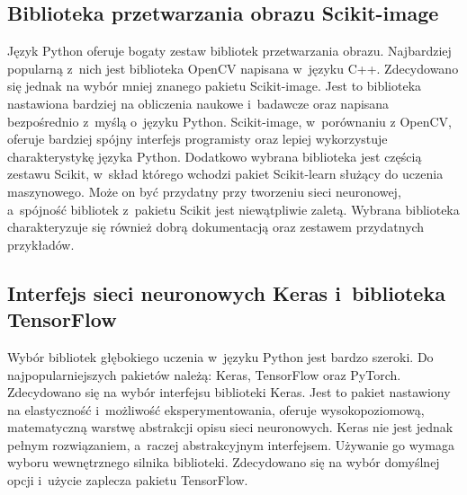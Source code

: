 \subsection{Biblioteka przetwarzania obrazu Scikit-image}
Język Python oferuje bogaty zestaw bibliotek przetwarzania obrazu.
Najbardziej popularną z~nich jest biblioteka OpenCV napisana w~języku C++.
Zdecydowano się jednak na wybór mniej znanego pakietu Scikit-image.
Jest to biblioteka nastawiona bardziej na obliczenia naukowe i~badawcze
oraz napisana bezpośrednio z~myślą o~języku Python.
Scikit-image, w~porównaniu z OpenCV, oferuje bardziej spójny interfejs
programisty oraz lepiej wykorzystuje charakterystykę języka Python.
Dodatkowo wybrana biblioteka jest częścią zestawu Scikit, w~skład
którego wchodzi pakiet Scikit-learn służący do uczenia maszynowego.
Może on być przydatny przy tworzeniu sieci neuronowej, a~spójność bibliotek
z~pakietu Scikit jest niewątpliwie zaletą.
Wybrana biblioteka charakteryzuje się również dobrą dokumentacją oraz
zestawem przydatnych przykładów.

\subsection{Interfejs sieci neuronowych Keras i~biblioteka TensorFlow}
Wybór bibliotek głębokiego uczenia w~języku Python jest bardzo szeroki.
Do najpopularniejszych pakietów należą: Keras, TensorFlow oraz PyTorch.
Zdecydowano się na wybór interfejsu biblioteki Keras.
Jest to pakiet nastawiony na elastyczność i~możliwość eksperymentowania,
oferuje wysokopoziomową, matematyczną warstwę abstrakcji opisu sieci
neuronowych.
Keras nie jest jednak pełnym rozwiązaniem, a~raczej abstrakcyjnym interfejsem.
Używanie go wymaga wyboru wewnętrznego silnika biblioteki.
Zdecydowano się na wybór domyślnej opcji i~użycie zaplecza pakietu TensorFlow.

